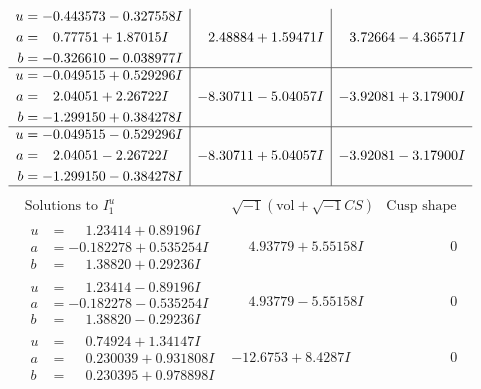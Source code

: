 \documentclass[1p]{elsarticle_modified}
\theoremstyle{definition}
\newcommand{\I}{\sqrt{-1}}
\begin{document}
$$\begin{array}{c|c|c}
\begin{aligned}
u &= -0.443573 - 0.327558 I \\
a &= \phantom{-}0.77751 + 1.87015 I \\
b &= -0.326610 - 0.038977 I\end{aligned}
 & \phantom{-}2.48884 + 1.59471 I & \phantom{-}3.72664 - 4.36571 I \\ \hline\begin{aligned}
u &= -0.049515 + 0.529296 I \\
a &= \phantom{-}2.04051 + 2.26722 I \\
b &= -1.299150 + 0.384278 I\end{aligned}
 & -8.30711 - 5.04057 I & -3.92081 + 3.17900 I \\ \hline\begin{aligned}
u &= -0.049515 - 0.529296 I \\
a &= \phantom{-}2.04051 - 2.26722 I \\
b &= -1.299150 - 0.384278 I\end{aligned}
 & -8.30711 + 5.04057 I & -3.92081 - 3.17900 I\\
 \hline 
 \end{array}$$\newpage$$\begin{array}{c|c|c}  
\text{Solutions to }I^u_{1}& \I (\text{vol} + \sqrt{-1}CS) & \text{Cusp shape}\\
 \hline 
\begin{aligned}
u &= \phantom{-}1.23414 + 0.89196 I \\
a &= -0.182278 + 0.535254 I \\
b &= \phantom{-}1.38820 + 0.29236 I\end{aligned}
 & \phantom{-}4.93779 + 5.55158 I & \phantom{-0.000000 } 0 \\ \hline\begin{aligned}
u &= \phantom{-}1.23414 - 0.89196 I \\
a &= -0.182278 - 0.535254 I \\
b &= \phantom{-}1.38820 - 0.29236 I\end{aligned}
 & \phantom{-}4.93779 - 5.55158 I & \phantom{-0.000000 } 0 \\ \hline\begin{aligned}
u &= \phantom{-}0.74924 + 1.34147 I \\
a &= \phantom{-}0.230039 + 0.931808 I \\
b &= \phantom{-}0.230395 + 0.978898 I\end{aligned}
 & -12.6753 + 8.4287 I & \phantom{-0.000000 } 0 \\ \hline\begin{aligned}

\end{aligned}
\end{array}$$
\end{document}
